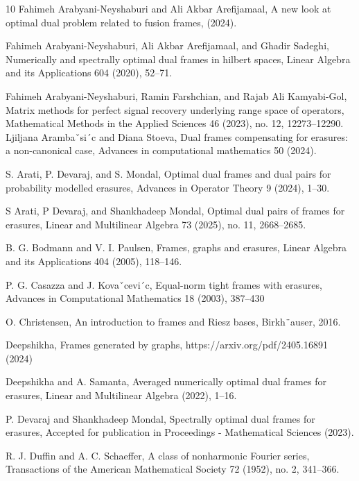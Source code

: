 \documentclass[final,1p,times]{elsarticle}
\begin{document}

\begin{thebibliography}{10}
 Fahimeh Arabyani-Neyshaburi and Ali Akbar Arefijamaal, A new look at optimal dual problem related to fusion
frames, (2024).

Fahimeh Arabyani-Neyshaburi, Ali Akbar Arefijamaal, and Ghadir Sadeghi, Numerically and spectrally optimal
dual frames in hilbert spaces, Linear Algebra and its Applications 604 (2020), 52–71.

Fahimeh Arabyani-Neyshaburi, Ramin Farshchian, and Rajab Ali Kamyabi-Gol, Matrix methods for perfect signal
recovery underlying range space of operators, Mathematical Methods in the Applied Sciences 46 (2023), no. 12,
12273–12290.
Ljiljana Arambaˇsi´c and Diana Stoeva, Dual frames compensating for erasures: a non-canonical case, Advances in computational mathematics 50 (2024).

S. Arati, P. Devaraj, and S. Mondal, Optimal dual frames and dual pairs for probability modelled erasures,
Advances in Operator Theory 9 (2024), 1–30.

S Arati, P Devaraj, and Shankhadeep Mondal, Optimal dual pairs of frames for erasures, Linear and Multilinear
Algebra 73 (2025), no. 11, 2668–2685.

B. G. Bodmann and V. I. Paulsen, Frames, graphs and erasures, Linear Algebra and its Applications 404 (2005),
118–146.

P. G. Casazza and J. Kovaˇcevi´c, Equal-norm tight frames with erasures, Advances in Computational Mathematics
18 (2003), 387–430

O. Christensen, An introduction to frames and Riesz bases, Birkh¨auser, 2016.

Deepshikha, Frames generated by graphs, https://arxiv.org/pdf/2405.16891 (2024)

Deepshikha and A. Samanta, Averaged numerically optimal dual frames for erasures, Linear and Multilinear
Algebra (2022), 1–16.

P. Devaraj and Shankhadeep Mondal, Spectrally optimal dual frames for erasures, Accepted for publication in
Proceedings - Mathematical Sciences (2023).

R. J. Duffin and A. C. Schaeffer, A class of nonharmonic Fourier series, Transactions of the American Mathematical
Society 72 (1952), no. 2, 341–366.


\end{thebibliography}
\end{document}
